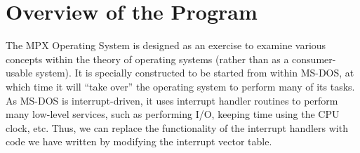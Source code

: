 \chapter{Overview of the Program}
\label{overview_of_program}

The MPX Operating System is designed as an exercise to examine various concepts within the theory of operating systems (rather than as a consumer-usable system). It is specially constructed to be started from within MS-DOS, at which time it will ``take over'' the operating system to perform many of its tasks. As MS-DOS is interrupt-driven, it uses interrupt handler routines to perform many low-level services, such as performing I/O, keeping time using the CPU clock, etc. Thus, we can replace the functionality of the interrupt handlers with code we have written by modifying the interrupt vector table.

